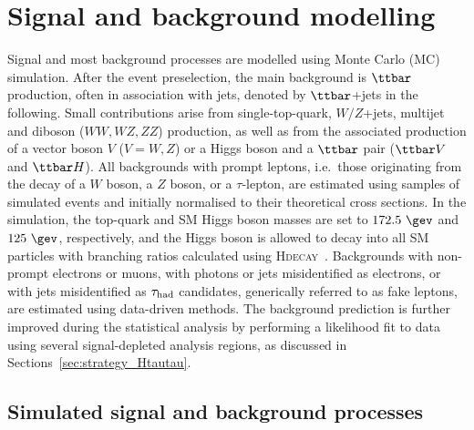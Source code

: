 \section{Signal and background modelling}
\label{sec:signal_background_model}

Signal and most background processes are modelled using Monte Carlo (MC) simulation.
After the event preselection, the main background is $\ttbar$ production, often in association with jets, denoted by $\ttbar$+jets in the following.
Small contributions arise from single-top-quark, $W/Z$+jets, multijet and diboson ($WW,WZ,ZZ$) production, as well as from the associated 
production of a vector boson $V$ ($V=W,Z$) or a Higgs boson and a $\ttbar$ pair ($\ttbar V$ and $\ttbar H$). All backgrounds 
with prompt leptons, i.e.\ those originating from the decay of a $W$ boson, a $Z$ boson, or a $\tau$-lepton,
are estimated using samples of simulated events and initially normalised to their theoretical cross sections.
In the simulation, the top-quark and SM Higgs boson masses are set to $172.5~\gev$ and $125~\gev$, respectively,
and the Higgs boson is allowed to decay into all SM particles with branching ratios calculated using \textsc{Hdecay}~\cite{Djouadi:1997yw}.  
Backgrounds with non-prompt electrons or muons, with photons or jets misidentified as electrons, or with jets misidentified as $\tau_{\mathrm{had}}$ candidates, 
generically referred to as fake leptons, are estimated using data-driven methods. 
The background prediction is further improved during the statistical analysis by performing a likelihood 
fit to data using several signal-depleted analysis regions, as discussed in Sections~\ref{sec:strategy_Htautau}.

\subsection{Simulated signal and background processes}
\label{sec:simulations}

